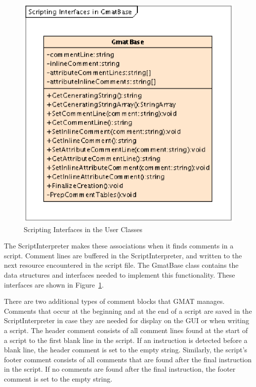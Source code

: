 \begin{figure}[htb]
\begin{center}
\includegraphics[scale=0.5]{Images/ScriptingInterfacesinGmatBase.eps}
\caption{\label{figure:GmatBaseCommentInterface}Scripting Interfaces in the User Classes}
\end{center}
\end{figure}

The ScriptInterpreter makes these associations when it finds comments in a script.  Comment lines
are buffered in the ScriptInterpreter, and written to the next resource encountered in the script
file.  The GmatBase class contains the data structures and interfaces needed to implement this
functionality.  These interfaces are shown in Figure~\ref{figure:GmatBaseCommentInterface}.

There are two additional types of comment blocks that GMAT manages.  Comments that occur at the
beginning and at the end of a script are saved in the ScriptInterpreter in case they are needed for
display on the GUI or when writing a script.  The header comment consists of all comment lines found
at the start of a script to the first blank line in the script. If an instruction is detected before
a blank line, the header comment is set to the empty string.  Similarly, the script's footer comment
consists of all comments that are found after the final instruction in the script.  If no comments
are found after the final instruction, the footer comment is set to the empty string.

